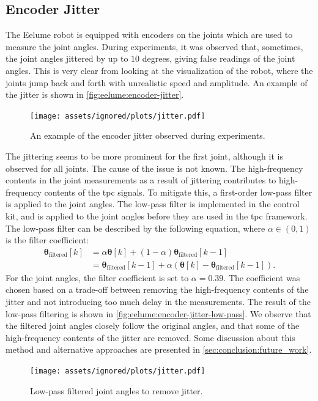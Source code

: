 \subsection*{Encoder Jitter}
The Eelume robot is equipped with encoders on the joints which are used to measure the joint angles.
During experiments, it was observed that, sometimes, the joint angles jittered by up to \(10\) degrees,
giving false readings of the joint angles. This is very clear from looking at
the visualization of the robot, where the joints jump back and forth with unrealistic
speed and amplitude.
An example of the jitter is shown in \autoref{fig:eelume:encoder-jitter}.
\begin{figure}[h!]
    \centering
    \texttt{[image: assets/ignored/plots/jitter.pdf]}
    \caption{An example of the encoder jitter observed during experiments.}
    \label{fig:eelume:encoder-jitter}
\end{figure}
The jittering seems to be more prominent for the first joint, although it is observed for all joints.
The cause of the issue is not known.
The high-frequency contents in the joint measurements as a result of jittering
contributes to high-frequency contents of the \gls{tpc} signals. To
mitigate this, a first-order low-pass filter is applied to the joint angles. The
low-pass filter is implemented in the control kit, and is applied to the joint angles before
they are used in the \gls{tpc} framework. The low-pass filter can be
described by the following equation, where \(\alpha \in (0, 1)\) is the filter coefficient:
\begin{subequations}
\begin{align}
    \bm{\theta}_{\textrm{filtered}}[k] &= \alpha \bm{\theta}[k] + (1 - \alpha)\bm{\theta}_{\text{filtered}}[k-1] \\
    &= \bm{\theta}_{\textrm{filtered}}[k-1] + \alpha\left( \bm{\theta}[k] - \bm{\theta}_{\textrm{filtered}}[k-1] \right).
\end{align}
\end{subequations}
For the joint angles, the filter coefficient is set to \(\alpha = 0.39\). The
coefficient was chosen based on a trade-off between removing the high-frequency
contents of the jitter and not introducing too much delay in the measurements. The
result of the low-pass filtering is shown in \autoref{fig:eelume:encoder-jitter-low-pass}.
We observe that the filtered joint angles closely follow the original angles,
and that some of the high-frequency contents of the jitter are removed. Some discussion
about this method and alternative approaches are presented in \autoref{sec:conclusion:future_work}.
\begin{figure}[h!]
    \centering
    \texttt{[image: assets/ignored/plots/jitter.pdf]}
    \caption{Low-pass filtered joint angles to remove jitter.}
    \label{fig:eelume:encoder-jitter-low-pass}
\end{figure}

